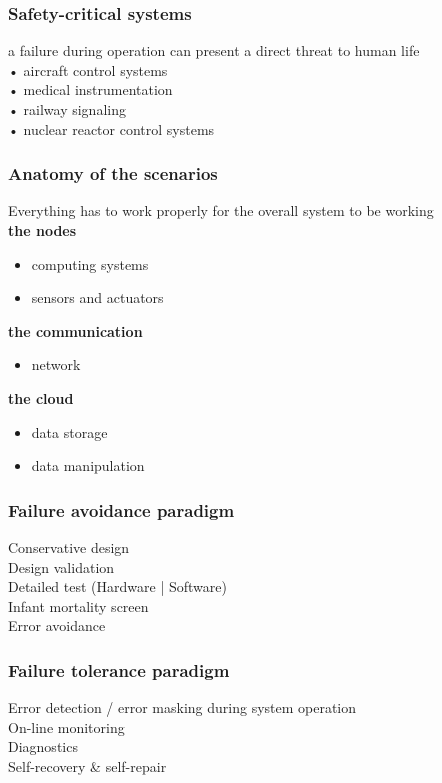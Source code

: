 \documentclass[10pt, oneside]{article}
\begin{document}
\subsubsection*{Safety-critical systems}a failure during operation can present a direct threat to human life\\
• aircraft control systems\\
• medical instrumentation\\
• railway signaling\\
• nuclear reactor control systems
\subsubsection{Anatomy of the scenarios}Everything has to work properly for the overall system to be working\\
{\bf the nodes}\begin{itemize}
    \item computing systems
    \item sensors and actuators
\end{itemize}
{\bf the communication}\begin{itemize}
    \item network
\end{itemize}
{\bf the cloud}\begin{itemize}
    \item data storage
    \item data manipulation
\end{itemize}
\subsubsection{Failure avoidance paradigm}Conservative design\\
Design validation\\
Detailed test (Hardware | Software)\\
Infant mortality screen \\
Error avoidance
\subsubsection{Failure tolerance paradigm}Error detection / error masking during system operation\\ On-line monitoring\\
Diagnostics\\
Self-recovery \& self-repair
\end{document}
